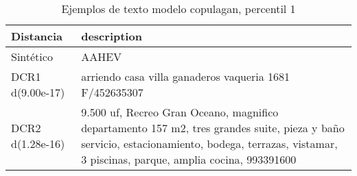 \begin{table}[H]
\centering
\fontsize{10}{14}\selectfont
\caption{Ejemplos de texto modelo copulagan, percentil 1}
\label{table-example-economicos-b-2-copulagan-1p-text}
\begin{tabular}{|l|m{35em}|}
\hline
\rowcolor[gray]{0.8}
Distancia & description \\
\hline Sintético & AAHEV \\
\hline DCR1 d(9.00e-17) & arriendo casa villa ganaderos vaqueria 1681 F/452635307 \\
\hline DCR2 d(1.28e-16) & 9.500 uf, Recreo Gran Oceano, magnifico departamento 157 m2, tres grandes suite, pieza y ba\~no servicio, estacionamiento, bodega, terrazas, vistamar, 3 piscinas, parque, amplia cocina, 993391600 \\
\hline
\end{tabular}
\end{table}
